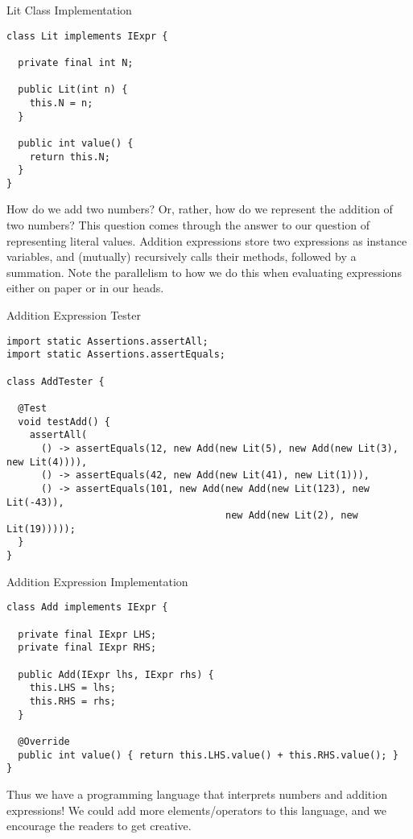 \begin{cl}{Lit Class Implementation}
\begin{lstlisting}[language=MyJava]
class Lit implements IExpr {

  private final int N;

  public Lit(int n) { 
    this.N = n; 
  }

  public int value() { 
    return this.N; 
  }
}
\end{lstlisting}
\end{cl}

How do we add two numbers? Or, rather, how do we represent the addition of two numbers? This question comes through the answer to our question of representing literal values. Addition expressions store two  expressions as instance variables, and (mutually) recursively calls their  methods, followed by a summation. Note the parallelism to how we do this when evaluating expressions either on paper or in our heads.

\begin{cl}{Addition Expression Tester}
\begin{lstlisting}[language=MyJava]
import static Assertions.assertAll;
import static Assertions.assertEquals;

class AddTester {

  @Test
  void testAdd() {
    assertAll(
      () -> assertEquals(12, new Add(new Lit(5), new Add(new Lit(3), new Lit(4)))),
      () -> assertEquals(42, new Add(new Lit(41), new Lit(1))),
      () -> assertEquals(101, new Add(new Add(new Lit(123), new Lit(-43)),
                                      new Add(new Lit(2), new Lit(19)))));
  }
}
\end{lstlisting}
\end{cl}

\begin{cl}{Addition Expression Implementation}
\begin{lstlisting}[language=MyJava]
class Add implements IExpr {

  private final IExpr LHS;
  private final IExpr RHS;

  public Add(IExpr lhs, IExpr rhs) {
    this.LHS = lhs;
    this.RHS = rhs;
  }

  @Override
  public int value() { return this.LHS.value() + this.RHS.value(); }
}
\end{lstlisting}
\end{cl}

Thus we have a programming language that interprets numbers and addition expressions! We could add more elements/operators to this language, and we encourage the readers to get creative.
  
